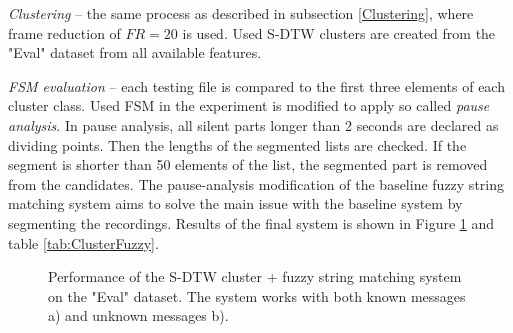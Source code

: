 \documentclass{ExcelAtFIT}
\begin{document}
\textit{Clustering} -- the same process as described in subsection \ref{Clustering}, where frame reduction of $FR=20$ is used. Used S-DTW clusters are created from the "Eval" dataset from all available features. 

\textit{FSM evaluation} -- each testing file is compared to the first three elements of each cluster class. Used FSM in the experiment is modified to apply so called \textit{pause analysis}. In pause analysis, all silent parts longer than 2 seconds are declared as dividing points. Then the lengths of the segmented lists are checked. If the segment is shorter than 50 elements of the list, the segmented part is removed from the candidates. The pause-analysis modification of the baseline fuzzy string matching system aims to solve the main issue with the baseline system by segmenting the recordings. Results of the final system is shown in Figure \ref{fig:ClusterFuzzyDET} and table \ref{tab:ClusterFuzzy}. 


\begin{figure}[hbt]
	\centering
	\caption{Performance of the S-DTW cluster + fuzzy string matching system on the "Eval" dataset. The system works with both known messages a) and unknown messages b).}
    \label{fig:ClusterFuzzyDET}
\end{figure}
\end{document}
